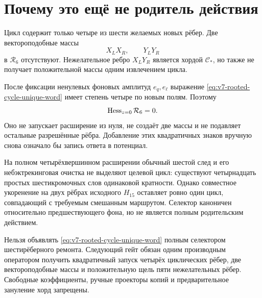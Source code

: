 \section{Почему это ещё не родитель действия}

Цикл содержит только четыре из шести желаемых новых рёбер. Две
вектороподобные массы
\begin{equation}
 X_LX_R,\qquad Y_LY_R
 \label{eq:v7-rooted-cycle-missing-vector-masses}
\end{equation}
в $\mathcal R_6$ отсутствуют. Нежелательное ребро $X_LY_R$ является
хордой $\mathcal C_*$, но также не получает положительной массы одним
извлечением цикла.

После фиксации ненулевых фоновых амплитуд $e_q,e_\ell$ выражение
\eqref{eq:v7-rooted-cycle-unique-word} имеет степень четыре по новым полям.
Поэтому
\begin{equation}
 \operatorname{Hess}_{z=0}\mathcal R_6=0.
 \label{eq:v7-rooted-cycle-zero-hessian}
\end{equation}
Оно не запускает расширение из нуля, не создаёт две массы и не подавляет
остальные разрешённые рёбра. Добавление этих квадратичных знаков вручную
снова означало бы запись ответа в потенциал.

\begin{theorem}
На полном четырёхвершинном расширении обычный шестой след и его
небэктрекинговая очистка не выделяют целевой цикл: существуют четырнадцать
простых шестикромочных слов одинаковой кратности. Однако совместное
укоренение на двух рёбрах исходного $H_{15}$ оставляет ровно один цикл,
совпадающий с требуемым смешанным маршрутом. Селектор каноничен относительно
предшествующего фона, но не является полным родительским действием.
\end{theorem}

\begin{nogocriterion}
Нельзя объявлять \eqref{eq:v7-rooted-cycle-unique-word} полным селектором
шестирёберного ремонта. Следующий гейт обязан одним производным оператором
получить квадратичный запуск четырёх циклических рёбер, две
вектороподобные массы и положительную щель пяти нежелательных рёбер. Свободные
коэффициенты, ручные проекторы копий и предварительное зануление хорд
запрещены.
\end{nogocriterion}

